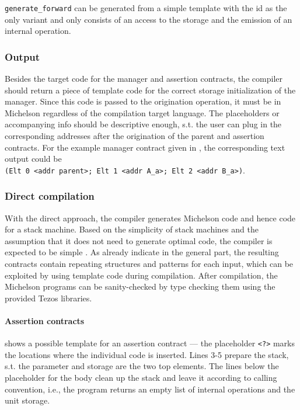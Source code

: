 \texttt{generate\_forward} can be generated from a simple template with the id as the only variant and only consists of  an access to the storage and the emission of an internal operation.

\subsubsection{Output}
Besides the target code for the manager and assertion contracts, the compiler should return a piece of template code for the correct storage initialization of the manager. Since this code is passed to the origination operation, it must be in Michelson regardless of the compilation target language. The placeholders or accompanying info should be descriptive enough, s.t. the user can plug in the corresponding addresses after the origination of the parent and assertion contracts. For the example manager contract given in , the corresponding text output could be\\
\texttt{(Elt 0 <addr parent>; Elt 1 <addr A\_a>; Elt 2 <addr B\_a>)}.

\subsubsection{Direct compilation}\label{sec:direct}
With the direct approach, the compiler generates Michelson code and hence code for a stack machine. Based on the simplicity of stack machines and the assumption that it does not need to generate optimal code, the compiler is expected to be simple \cite{cs5641}\cite{ferr_compiler}\cite{wiki:stack_machine}. As already indicate in the general part, the resulting contracts contain repeating structures and patterns for each input, which can be exploited by using template code during compilation. After compilation, the Michelson programs can be sanity-checked by type checking them using the provided Tezos libraries.

\paragraph{Assertion contracts}
 shows a possible template for an assertion contract --- the placeholder \texttt{<?>} marks the locations where the individual code is inserted. Lines 3-5 prepare the stack, s.t. the parameter and storage are the two top elements. The lines below the placeholder for the body clean up the stack and leave it according to calling convention, i.e., the program returns an empty list of internal operations and the unit storage.


